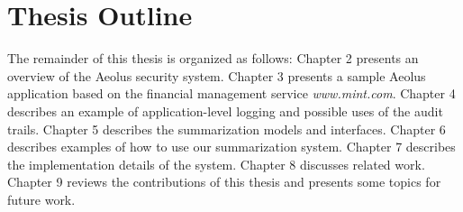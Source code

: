 



\section{Thesis Outline}

The remainder of this thesis is organized as follows: Chapter 2 presents an overview of the Aeolus security system. Chapter 3 presents a sample Aeolus application based on the financial management service \emph{www.mint.com}. Chapter 4 describes an example of application-level logging and possible uses of the audit trails. Chapter 5 describes the summarization models and interfaces. Chapter 6 describes examples of how to use our summarization system. Chapter 7 describes the implementation details of the system. Chapter 8 discusses related work. Chapter 9 reviews the contributions of this thesis and presents some topics for future work.
